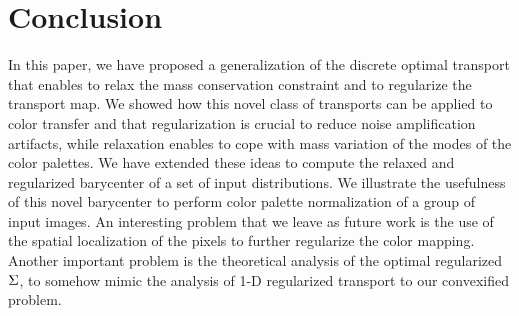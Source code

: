 \section*{Conclusion}

In this paper, we have proposed a generalization of the discrete optimal transport that enables to relax the mass conservation constraint and to regularize the transport map. We showed how this novel class of transports can be applied to color transfer and that regularization is crucial to reduce noise amplification artifacts, while relaxation enables to cope with mass variation of the modes of the color palettes. We have extended these ideas to compute the relaxed and regularized barycenter of a set of input distributions. We illustrate the usefulness of this novel barycenter to perform color palette normalization of a group of input images. An interesting problem that we leave as future work is the use of the spatial localization of the pixels to further regularize the color mapping. Another important problem is the theoretical analysis of the optimal regularized $\Sigma$, to somehow mimic the analysis of 1-D regularized transport to our convexified problem. 

